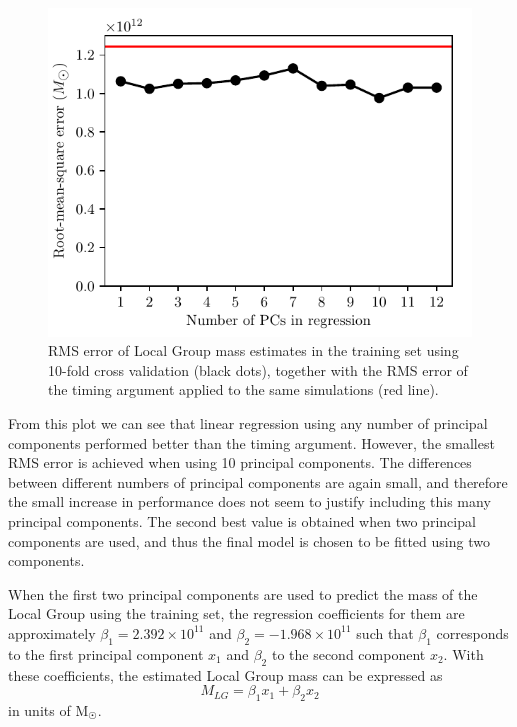 \documentclass[english, twoside]{HYgradu}
\begin{document}
\begin{figure}
    \centering
    \includegraphics{kuvat/PCA/training-RMSE.pdf}
    \caption{RMS error of Local Group mass estimates in the training set using 10-fold cross validation (black dots), together with the RMS error of the timing argument applied to the same simulations (red line).}\label{fig:pca-rmse-training}
\end{figure}

From this plot we can see that linear regression using any number of principal components performed better than the timing argument. However, the smallest RMS error is achieved when using 10 principal components. The differences between different numbers of principal components are again small, and therefore the small increase in performance does not seem to justify including this many principal components. The second best value is obtained when two principal components are used, and thus the final model is chosen to be fitted using two components.

When the first two principal components are used to predict the mass of the Local Group using the training set, the regression coefficients for them are approximately $\beta_1 = 2.392 \times 10^{11}$ and $\beta_2 = -1.968 \times 10^{11}$ such that $\beta_1$ corresponds to the first principal component $x_1$ and $\beta_2$ to the second component $x_2$. With these coefficients, the estimated Local Group mass can be expressed as
\begin{equation} \label{equ:pcr}
	M_{LG} = \beta_1 x_{1} + \beta_2 x_{2}
\end{equation}
in units of $\mathrm{M}_{\astrosun}$. 
\end{document}
